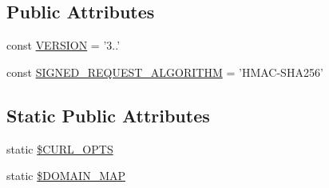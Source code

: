 \subsection*{Public Attributes}
\begin{DoxyCompactItemize}
\item 
const \hyperlink{classBaseFacebook_ae0ee825ecd33e197a890c9b47ee14bd8}{V\-E\-R\-S\-I\-O\-N} = '3..'
\item 
const \hyperlink{classBaseFacebook_a91b50b70a2d503d402d67ac8398d34b0}{S\-I\-G\-N\-E\-D\-\_\-\-R\-E\-Q\-U\-E\-S\-T\-\_\-\-A\-L\-G\-O\-R\-I\-T\-H\-M} = 'H\-M\-A\-C-\/S\-H\-A256'
\end{DoxyCompactItemize}
\subsection*{Static Public Attributes}
\begin{DoxyCompactItemize}
\item 
static \hyperlink{classBaseFacebook_ad48ad58bc8120acf03f199bb100be6dd}{\$\-C\-U\-R\-L\-\_\-\-O\-P\-T\-S}
\item 
static \hyperlink{classBaseFacebook_a154dee18518e85547854c5d51f77e314}{\$\-D\-O\-M\-A\-I\-N\-\_\-\-M\-A\-P}
\end{DoxyCompactItemize}
